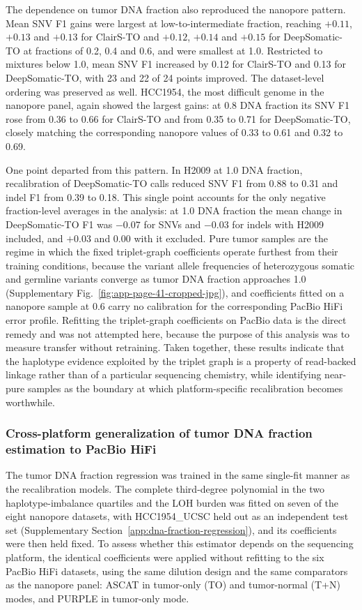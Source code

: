 \documentclass[pdflatex,sn-nature]{sn-jnl}
\begin{document}
The dependence on tumor DNA fraction also reproduced the nanopore pattern. Mean SNV F1 gains were largest at low-to-intermediate fraction, reaching $+0.11$, $+0.13$ and $+0.13$ for ClairS-TO and $+0.12$, $+0.14$ and $+0.15$ for DeepSomatic-TO at fractions of 0.2, 0.4 and 0.6, and were smallest at 1.0. Restricted to mixtures below 1.0, mean SNV F1 increased by 0.12 for ClairS-TO and 0.13 for DeepSomatic-TO, with 23 and 22 of 24 points improved. The dataset-level ordering was preserved as well. HCC1954, the most difficult genome in the nanopore panel, again showed the largest gains: at 0.8 DNA fraction its SNV F1 rose from 0.36 to 0.66 for ClairS-TO and from 0.35 to 0.71 for DeepSomatic-TO, closely matching the corresponding nanopore values of 0.33 to 0.61 and 0.32 to 0.69.

One point departed from this pattern. In H2009 at 1.0 DNA fraction, recalibration of DeepSomatic-TO calls reduced SNV F1 from 0.88 to 0.31 and indel F1 from 0.39 to 0.18. This single point accounts for the only negative fraction-level averages in the analysis: at 1.0 DNA fraction the mean change in DeepSomatic-TO F1 was $-0.07$ for SNVs and $-0.03$ for indels with H2009 included, and $+0.03$ and $0.00$ with it excluded. Pure tumor samples are the regime in which the fixed triplet-graph coefficients operate furthest from their training conditions, because the variant allele frequencies of heterozygous somatic and germline variants converge as tumor DNA fraction approaches 1.0 (Supplementary Fig.~\ref{fig:app-page-41-cropped-jpg}), and coefficients fitted on a nanopore sample at 0.6 carry no calibration for the corresponding PacBio HiFi error profile. Refitting the triplet-graph coefficients on PacBio data is the direct remedy and was not attempted here, because the purpose of this analysis was to measure transfer without retraining. Taken together, these results indicate that the haplotype evidence exploited by the triplet graph is a property of read-backed linkage rather than of a particular sequencing chemistry, while identifying near-pure samples as the boundary at which platform-specific recalibration becomes worthwhile.

\subsubsection*{Cross-platform generalization of tumor DNA fraction estimation to PacBio HiFi}\label{supp:pacbio-tdf}

The tumor DNA fraction regression was trained in the same single-fit manner as the recalibration models. The complete third-degree polynomial in the two haplotype-imbalance quartiles and the LOH burden was fitted on seven of the eight nanopore datasets, with HCC1954\_UCSC held out as an independent test set (Supplementary Section~\ref{app:dna-fraction-regression}), and its coefficients were then held fixed. To assess whether this estimator depends on the sequencing platform, the identical coefficients were applied without refitting to the six PacBio HiFi datasets, using the same dilution design and the same comparators as the nanopore panel: ASCAT in tumor-only (TO) and tumor-normal (T+N) modes, and PURPLE in tumor-only mode.
\end{document}

